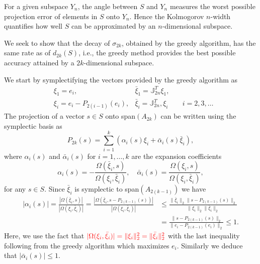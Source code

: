 For a given subspace $Y_n$, the angle between $S$ and $Y_n$ measures the worst possible projection error of elements in $S$ onto $Y_n$. Hence the Kolmogorov $n$-width quantifies how well $S$ can be approximated by {\edit an} $n$-dimensional subspace. 

We seek to show that the decay of $\sigma_{2k}$, obtained by the greedy algorithm, has the same rate as of $d_{2k}(S)$, i.e., the greedy method provides the best possible accuracy attained by a $2k$-dimensional subspace.

We start by symplectifying the vectors provided by the greedy algorithm as
\begin{equation} \label{eq:new6}
\begin{aligned}
	& \xi_1 = e_i, & \bar{\xi}_1 = \mathbb{J}_{2n}^T \xi_1, &\\
	& \xi_i = e_i - P_{2(i-1)} (e_i), & \bar{\xi}_i = \mathbb{J}_{2n}^T, \xi_i &\quad i = 2,3,\dots
\end{aligned}
\end{equation}
The projection of a vector $s\in S$ onto span$(A_{2k})$ can be written using the symplectic basis as
\begin{equation} \label{eq:new7}
	P_{2k}(s) = \sum_{i=1}^k \left( \alpha_i(s) \xi_i + \bar{\alpha}_i(s) \bar{\xi}_i \right),
\end{equation}
where $\alpha_i(s)$ and $\bar{\alpha}_i(s)$ for $i=1,\dots,k$ are the expansion coefficients
\begin{equation} \label{eq:new8}
	\alpha_i(s) = - \frac{\Omega(\bar{\xi}_i,s)}{\Omega(\xi_i,\bar{\xi}_i)}, \quad \bar{\alpha}_i(s) = \frac{\Omega(\xi_i,s)}{\Omega(\xi_i,\bar{\xi}_i)},
\end{equation}
for any $s\in S$. Since $\bar{\xi}_i$ is symplectic to span$(A_{2(k-1)})$ we have
\begin{equation} \label{eq:new9}
\begin{aligned}
	|\alpha_i(s)| = \frac{|\Omega(\bar{\xi}_i,s)|}{|\Omega(\xi_i,\bar{\xi}_i)|} = \frac{|\Omega( \bar{\xi}_i, s - P_{2(k-1)}(s))|}{|\Omega(\xi_i,\bar{\xi}_i)|}  &\leq \frac{\|\bar{\xi}_i\|_2 \| s - P_{2(k-1)}(s) \|_2}{ \|\xi_i\|_2 \|\bar{\xi}_i\|_2 } \\
	&= \frac{\| s - P_{2(k-1)}(s) \|_2}{\| e_i - P_{2(k-1)}(e_i) \|_2} \leq 1.
\end{aligned}
\end{equation}
Here, we use the fact that $\color{red} |\Omega(\xi_i,\bar{\xi}_i)| = \| \xi_i \|^2_2 = \|\bar{\xi}_i\|^2_2$ with the last inequality following from the greedy algorithm which maximizes $e_i$. Similarly we deduce that $|\bar{\alpha}_i(s)|\leq 1$.

